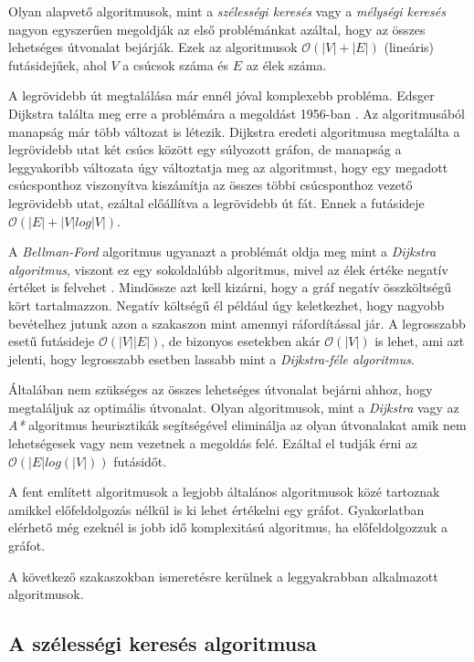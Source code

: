 Olyan alapvető algoritmusok, mint a \textit{szélességi
keresés} vagy a \textit{mélységi keresés} nagyon egyszerűen megoldják az első problémánkat azáltal, hogy az összes lehetséges útvonalat bejárják. Ezek az algoritmusok $\mathcal{O}(|V| + |E|)$ (lineáris) futásidejűek, ahol $V$ a csúcsok száma és $E$ az élek száma.

A legrövidebb út megtalálása már ennél jóval komplexebb probléma. Edsger Dijkstra találta meg erre a problémára a megoldást 1956-ban \cite{dijkstra}. Az algoritmusából manapság már több változat is létezik. Dijkstra eredeti algoritmusa megtalálta a legrövidebb utat két csúcs között egy súlyozott gráfon, de manapság a leggyakoribb változata úgy változtatja meg az algoritmust, hogy egy megadott csúcsponthoz viszonyítva kiszámítja az összes többi csúcsponthoz vezető legrövidebb utat, ezáltal előállítva a legrövidebb út fát. Ennek a futásideje $\mathcal{O}(|E| + |V| log|V|)$.

A \textit{Bellman-Ford} algoritmus ugyanazt a problémát oldja meg mint a \textit{Dijkstra algoritmus}, viszont ez egy sokoldalúbb algoritmus, mivel az élek értéke negatív értéket is felvehet \cite{bellmanford}. Mindössze azt kell kizárni, hogy a gráf negatív összköltségű kört tartalmazzon. Negatív költségű él például úgy keletkezhet, hogy nagyobb bevételhez jutunk azon a szakaszon mint amennyi ráfordítással jár. A legrosszabb esetű futásideje $\mathcal{O}(|V||E|)$, de bizonyos esetekben akár $\mathcal{O}(|V|)$ is lehet, ami azt jelenti, hogy legrosszabb esetben lassabb mint a \textit{Dijkstra-féle algoritmus}.

Általában nem szükséges az összes lehetséges útvonalat bejárni ahhoz, hogy megtaláljuk az optimális útvonalat. Olyan algoritmusok, mint a \textit{Dijkstra} vagy az \textit{A*} algoritmus heurisztikák segítségével eliminálja az olyan útvonalakat amik nem lehetségesek vagy nem vezetnek a megoldás felé. Ezáltal el tudják érni az $\mathcal{O}(|E| log(|V|))$ futásidőt. 

A fent említett algoritmusok a legjobb általános algoritmusok közé tartoznak amikkel előfeldolgozás nélkül is ki lehet értékelni egy gráfot. Gyakorlatban elérhető még ezeknél is jobb idő komplexitású algoritmus, ha előfeldolgozzuk a gráfot.

A következő szakaszokban ismeretésre kerülnek a leggyakrabban alkalmazott algoritmusok.

\subsection{A szélességi keresés algoritmusa}

